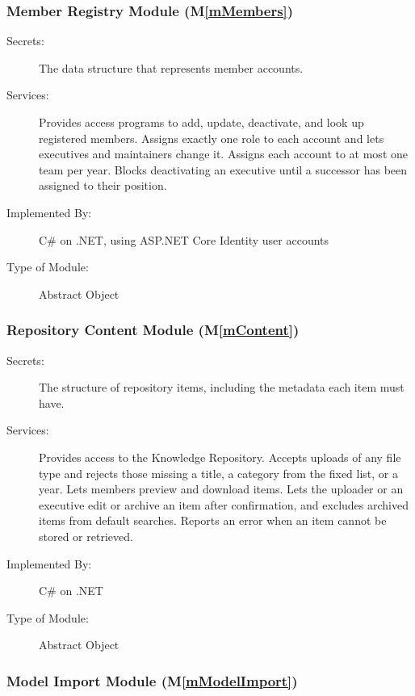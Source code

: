 \documentclass[12pt, titlepage]{article}
\begin{document}
\subsubsection{Member Registry Module (M\ref*{mMembers})}\label{mMembers:dec}

\begin{description}
\item[Secrets:] The data structure that represents member accounts.
\item[Services:] Provides access programs to add, update, deactivate, and look
  up registered members. Assigns exactly one role to each account and lets
  executives and maintainers change it. Assigns each account to at most one team
  per year.
  Blocks deactivating an executive until a successor has been assigned to their
  position.
\item[Implemented By:] C\# on .NET, using ASP.NET Core Identity user accounts
\item[Type of Module:] Abstract Object
\end{description}

\subsubsection{Repository Content Module (M\ref*{mContent})}\label{mContent:dec}

\begin{description}
\item[Secrets:] The structure of repository items, including the metadata each item must have.
\item[Services:] Provides access to the Knowledge Repository. Accepts uploads of
  any file type and rejects those missing a title, a category from the fixed
  list, or a year. Lets members preview and download items. Lets the uploader or
  an executive edit or archive an item after confirmation, and excludes archived
  items from default searches. Reports an error when an item cannot be stored or
  retrieved.
\item[Implemented By:] C\# on .NET
\item[Type of Module:] Abstract Object
\end{description}

\subsubsection{Model Import Module (M\ref*{mModelImport})}\label{mModelImport:dec}
\end{document}
